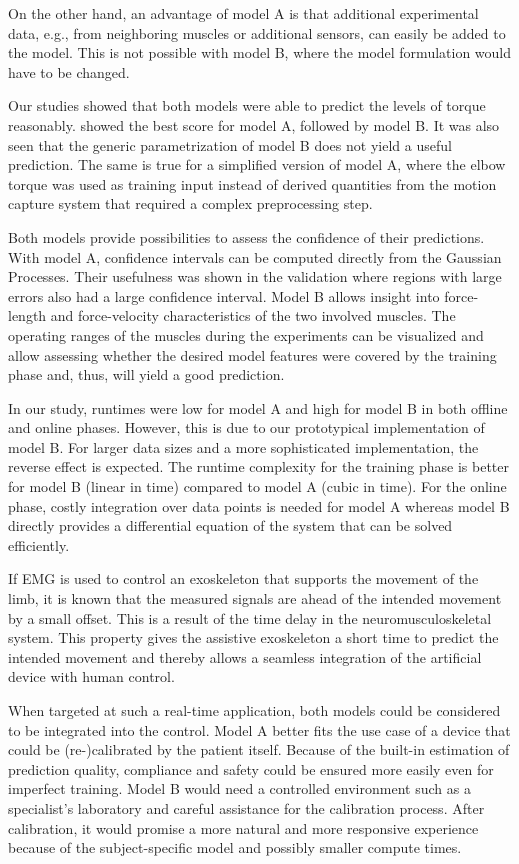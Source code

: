 On the other hand, an advantage of model A is that additional experimental data, e.g., from neighboring muscles or additional sensors, can easily be added to the model. This is not possible with model B, where the model formulation would have to be changed.

Our studies showed that both models were able to predict the levels of torque reasonably. 
 showed the best score for model A, followed by model B. It was also seen that the generic parametrization of model B does not yield a useful prediction. The same is true for a simplified version of model A, where the elbow torque was used as training input instead of derived quantities from the motion capture system that required a complex preprocessing step.

Both models provide possibilities to assess the confidence of their predictions. With model A, confidence intervals can be computed directly from the Gaussian Processes. Their usefulness was shown in the validation where regions with large errors also had a large confidence interval. 
Model B allows insight into force-length and force-velocity characteristics of the two involved muscles. The operating ranges of the muscles during the experiments can be visualized and allow assessing whether the desired model features were covered by the training phase and, thus, will yield a good prediction.

In our study, runtimes were low for model A and high for model B in both offline and online phases. However, this is due to our prototypical implementation of model B. For larger data sizes and a more sophisticated implementation, the reverse effect is expected. The runtime complexity for the training phase is better for model B (linear in time) compared to model A (cubic in time). For the online phase, costly integration over data points is needed for model A whereas model B directly provides a differential equation of the system that can be solved efficiently. 

If EMG is used to control an exoskeleton that supports the movement of the limb, it is known that the measured signals are ahead of the intended movement by a small offset. This is a result of the time delay in the neuromusculoskeletal system. This property gives the assistive exoskeleton a short time to predict the intended movement and thereby allows a seamless integration of the artificial device with human control.

When targeted at such a real-time application, both models could be considered to be integrated into the control. Model A better fits the use case of a device that could be (re\nobreakdash-)calibrated by the patient itself. Because of the built-in estimation of prediction quality, compliance and safety could be ensured more easily even for imperfect training.
Model B would need a controlled environment such as a specialist's laboratory and careful assistance for the calibration process.
After calibration, it would promise a more natural and more responsive experience because of the subject-specific model and possibly smaller compute times.

